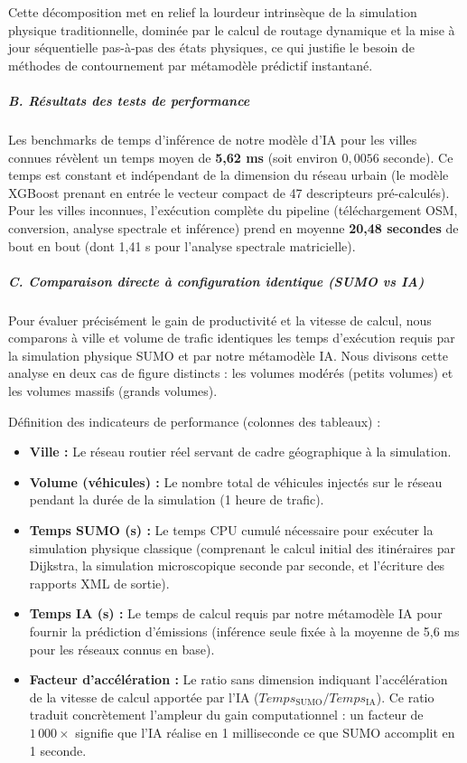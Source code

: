 \documentclass[10pt, a4paper]{article}
\providecommand{\tightlist}{}
\begin{document}
Cette décomposition met en relief la lourdeur intrinsèque de la
simulation physique traditionnelle, dominée par le calcul de routage
dynamique et la mise à jour séquentielle pas-à-pas des états physiques,
ce qui justifie le besoin de méthodes de contournement par métamodèle
prédictif instantané.

\subparagraph{B. Résultats des tests de
performance}\label{b.-ruxe9sultats-des-tests-de-performance}

Les benchmarks de temps d'inférence de notre modèle d'IA pour les villes
connues révèlent un temps moyen de \textbf{5,62 ms} (soit environ
\(0,0056\) seconde). Ce temps est constant et indépendant de la
dimension du réseau urbain (le modèle XGBoost prenant en entrée le
vecteur compact de 47 descripteurs pré-calculés). Pour les villes
inconnues, l'exécution complète du pipeline (téléchargement OSM,
conversion, analyse spectrale et inférence) prend en moyenne
\textbf{20,48 secondes} de bout en bout (dont 1,41 s pour l'analyse
spectrale matricielle).

\subparagraph{C. Comparaison directe à configuration identique (SUMO vs
IA)}\label{c.-comparaison-directe-uxe0-configuration-identique-sumo-vs-ia}

Pour évaluer précisément le gain de productivité et la vitesse de
calcul, nous comparons à ville et volume de trafic identiques les temps
d'exécution requis par la simulation physique SUMO et par notre
métamodèle IA. Nous divisons cette analyse en deux cas de figure
distincts : les volumes modérés (petits volumes) et les volumes massifs
(grands volumes).

Définition des indicateurs de performance (colonnes des tableaux) :

\begin{itemize}
\tightlist
\item
  \textbf{Ville :} Le réseau routier réel servant de cadre géographique
  à la simulation.
\item
  \textbf{Volume (véhicules) :} Le nombre total de véhicules injectés
  sur le réseau pendant la durée de la simulation (1 heure de trafic).
\item
  \textbf{Temps SUMO (s) :} Le temps CPU cumulé nécessaire pour exécuter
  la simulation physique classique (comprenant le calcul initial des
  itinéraires par Dijkstra, la simulation microscopique seconde par
  seconde, et l'écriture des rapports XML de sortie).
\item
  \textbf{Temps IA (s) :} Le temps de calcul requis par notre métamodèle
  IA pour fournir la prédiction d'émissions (inférence seule fixée à la
  moyenne de 5,6 ms pour les réseaux connus en base).
\item
  \textbf{Facteur d'accélération :} Le ratio sans dimension indiquant
  l'accélération de la vitesse de calcul apportée par l'IA
  (\(Temps_{\text{SUMO}} / Temps_{\text{IA}}\)). Ce ratio traduit
  concrètement l'ampleur du gain computationnel : un facteur de
  \(1\,000\times\) signifie que l'IA réalise en 1 milliseconde ce que
  SUMO accomplit en 1 seconde.
\end{itemize}
\end{document}
